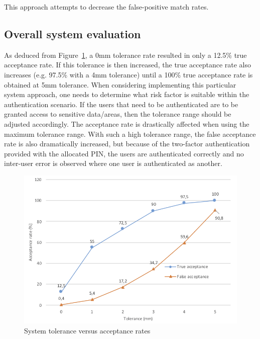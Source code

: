 This approach attempts to decrease the false-positive match rates. 


\subsection{Overall system evaluation}

As deduced from Figure~\ref{fig:System tolerance versus acceptance rates}, a 0mm tolerance rate resulted in only a 12.5\% true acceptance rate. If this tolerance is then increased, the true acceptance rate also increases (e.g. 97.5\% with a 4mm tolerance) until a 100\% true acceptance rate is obtained at 5mm tolerance. 
When considering implementing this particular system approach, one needs to determine what risk factor is suitable within the authentication scenario. If the users that need to be authenticated are to be granted access to sensitive data/areas, then the tolerance range should be adjusted accordingly. The acceptance rate is drastically affected when using the maximum tolerance range. With such a high tolerance range, the false acceptance rate is also dramatically increased, but because of the two-factor authentication provided with the allocated PIN, the users are authenticated correctly and no inter-user error is observed where one user is authenticated as another.

    
    \begin{figure}[htbp!] 
    \centering    
    \includegraphics[width=1.0\textwidth]{Chapter4/Figs/Tolerance.png}
    \caption[System tolerance versus acceptance rates]{System tolerance versus acceptance rates}
    \label{fig:System tolerance versus acceptance rates}
    \end{figure}


